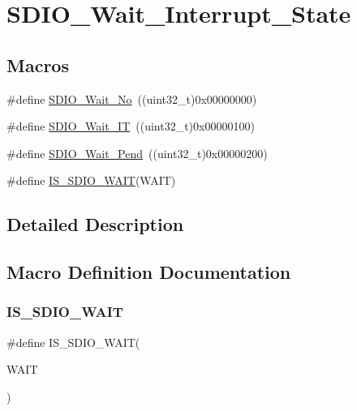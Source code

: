 \hypertarget{group___s_d_i_o___wait___interrupt___state}{}\section{S\+D\+I\+O\+\_\+\+Wait\+\_\+\+Interrupt\+\_\+\+State}
\label{group___s_d_i_o___wait___interrupt___state}
\subsection*{Macros}
\begin{DoxyCompactItemize}
\item 
\#define \mbox{\hyperlink{group___s_d_i_o___wait___interrupt___state_ga266294e1ffd7a4b45e62bff753ca44b2}{S\+D\+I\+O\+\_\+\+Wait\+\_\+\+No}}~((uint32\+\_\+t)0x00000000)
\item 
\#define \mbox{\hyperlink{group___s_d_i_o___wait___interrupt___state_ga3914bbe26a656c8e151272ccdc12c71c}{S\+D\+I\+O\+\_\+\+Wait\+\_\+\+IT}}~((uint32\+\_\+t)0x00000100)
\item 
\#define \mbox{\hyperlink{group___s_d_i_o___wait___interrupt___state_ga2a4104023a7f8403ddd159ec3bbb8592}{S\+D\+I\+O\+\_\+\+Wait\+\_\+\+Pend}}~((uint32\+\_\+t)0x00000200)
\item 
\#define \mbox{\hyperlink{group___s_d_i_o___wait___interrupt___state_ga7ee5c289c8e06a76b849808d15b03810}{I\+S\+\_\+\+S\+D\+I\+O\+\_\+\+W\+A\+IT}}(W\+A\+IT)
\end{DoxyCompactItemize}


\subsection{Detailed Description}


\subsection{Macro Definition Documentation}
\mbox{\label{group___s_d_i_o___wait___interrupt___state_ga7ee5c289c8e06a76b849808d15b03810}} 
\subsubsection{\texorpdfstring{IS\_SDIO\_WAIT}{IS\_SDIO\_WAIT}}
{\footnotesize\ttfamily \#define I\+S\+\_\+\+S\+D\+I\+O\+\_\+\+W\+A\+IT(\begin{DoxyParamCaption}\item[{}]{W\+A\+IT }\end{DoxyParamCaption})}

